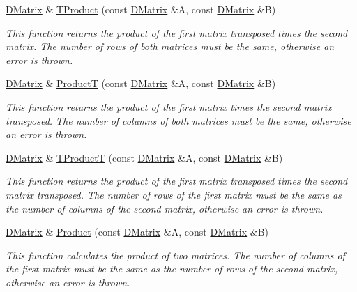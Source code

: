 \begin{DoxyCompactItemize}
\hyperlink{classDMatrix}{DMatrix} \& \hyperlink{classDMatrix_a36fc8f1174ba00e793bd88142dc11b9f}{TProduct} (const \hyperlink{classDMatrix}{DMatrix} \&A, const \hyperlink{classDMatrix}{DMatrix} \&B)
\begin{DoxyCompactList}\small\item\em This function returns the product of the first matrix transposed times the second matrix. The number of rows of both matrices must be the same, otherwise an error is thrown. \item\end{DoxyCompactList}\item 
\hyperlink{classDMatrix}{DMatrix} \& \hyperlink{classDMatrix_ad77d1a08b972e1cbba7bb60b7ea20bf1}{ProductT} (const \hyperlink{classDMatrix}{DMatrix} \&A, const \hyperlink{classDMatrix}{DMatrix} \&B)
\begin{DoxyCompactList}\small\item\em This function returns the product of the first matrix times the second matrix transposed. The number of columns of both matrices must be the same, otherwise an error is thrown. \item\end{DoxyCompactList}\item 
\hyperlink{classDMatrix}{DMatrix} \& \hyperlink{classDMatrix_acf0028536903ebb3dc83f1a83b20165c}{TProductT} (const \hyperlink{classDMatrix}{DMatrix} \&A, const \hyperlink{classDMatrix}{DMatrix} \&B)
\begin{DoxyCompactList}\small\item\em This function returns the product of the first matrix transposed times the second matrix transposed. The number of rows of the first matrix must be the same as the number of columns of the second matrix, otherwise an error is thrown. \item\end{DoxyCompactList}\item 
\hyperlink{classDMatrix}{DMatrix} \& \hyperlink{classDMatrix_a4d51f780b4a609cd73c6c6b9b2ff1884}{Product} (const \hyperlink{classDMatrix}{DMatrix} \&A, const \hyperlink{classDMatrix}{DMatrix} \&B)
\begin{DoxyCompactList}\small\item\em This function calculates the product of two matrices. The number of columns of the first matrix must be the same as the number of rows of the second matrix, otherwise an error is thrown. \item\end{DoxyCompactList}\item 

\end{DoxyCompactItemize}
